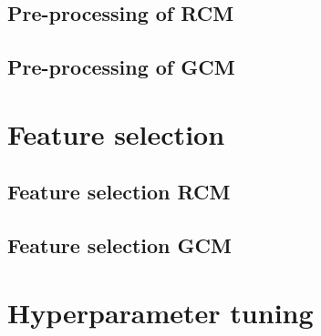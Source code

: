 \documentclass[a4paper,11pt,oneside]{report}
\begin{document}
\section{Pre-processing of RCM}
\section{Pre-processing of GCM}
\chapter{Feature selection}
\section{Feature selection RCM}
\section{Feature selection GCM}

\chapter{Hyperparameter tuning}


%
\end{document}
